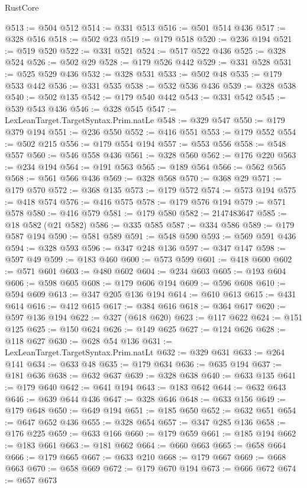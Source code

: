 \begin{lexlean}{RustCore}
\begin{coremodule}
@513 := @504 @512
@514 := @331 @513
@516 := @501 @514 @436
@517 := @328 @516
@518 := @502 @23
@519 := @179 @518
@520 := @236 @194
@521 := @519 @520
@522 := @331 @521
@524 := @517 @522 @436
@525 := @328 @524
@526 := @502 @29
@528 := @179 @526 @442
@529 := @331 @528
@531 := @525 @529 @436
@532 := @328 @531
@533 := @502 @48
@535 := @179 @533 @442
@536 := @331 @535
@538 := @532 @536 @436
@539 := @328 @538
@540 := @502 @135
@542 := @179 @540 @442
@543 := @331 @542
@545 := @539 @543 @436
@546 := @328 @545
@547 := LexLeanTarget.TargetSyntax.Prim.natLe
@548 := @329 @547
@550 := @179 @379 @194
@551 := @236 @550
@552 := @416 @551
@553 := @179 @552
@554 := @502 @215
@556 := @179 @554 @194
@557 := @553 @556
@558 := @548 @557
@560 := @546 @558 @436
@561 := @328 @560
@562 := @176 @220
@563 := @234 @194
@564 := @191 @563
@565 := @189 @564
@566 := @562 @565
@568 := @561 @566 @436
@569 := @328 @568
@570 := @368 @29
@571 := @179 @570
@572 := @368 @135
@573 := @179 @572
@574 := @573 @194
@575 := @418 @574
@576 := @416 @575
@578 := @179 @576 @194
@579 := @571 @578
@580 := @416 @579
@581 := @179 @580
@582 := 2147483647
@585 := @18 @582 (@21 @582)
@586 := @335 @585
@587 := @334 @586
@589 := @179 @587 @194
@590 := @581 @589
@591 := @548 @590
@593 := @569 @591 @436
@594 := @328 @593
@596 := @347 @248 @136
@597 := @347 @147
@598 := @597 @49
@599 := @183 @460
@600 := @573 @599
@601 := @418 @600
@602 := @571 @601
@603 := @480 @602
@604 := @234 @603
@605 := @193 @604
@606 := @598 @605
@608 := @179 @606 @194
@609 := @596 @608
@610 := @594 @609
@613 := @347 @205 @136 @194
@614 := @610 @613
@615 := @431 @614
@616 := @412 @615
@617 := @384 @616
@618 := @364 @617
@620 := @597 @136 @194
@622 := @327 (@618 @620)
@623 := @117 @622
@624 := @151 @125
@625 := @150 @624
@626 := @149 @625
@627 := @124 @626
@628 := @118 @627
@630 := @628 @54 @136
@631 := LexLeanTarget.TargetSyntax.Prim.natLt
@632 := @329 @631
@633 := @264 @141
@634 := @633 @48
@635 := @179 @634
@636 := @635 @194
@637 := @181 @636
@638 := @632 @637
@639 := @328 @638
@640 := @633 @135
@641 := @179 @640
@642 := @641 @194
@643 := @183 @642
@644 := @632 @643
@646 := @639 @644 @436
@647 := @328 @646
@648 := @633 @156
@649 := @179 @648
@650 := @649 @194
@651 := @185 @650
@652 := @632 @651
@654 := @647 @652 @436
@655 := @328 @654
@657 := @347 @285 @136
@658 := @176 @225
@659 := @633 @166
@660 := @179 @659
@661 := @185 @194
@662 := @183 @661
@663 := @181 @662
@664 := @660 @663
@665 := @658 @664
@666 := @179 @665
@667 := @633 @210
@668 := @179 @667
@669 := @668 @663
@670 := @658 @669
@672 := @179 @670 @194
@673 := @666 @672
@674 := @657 @673

\end{coremodule}
\end{lexlean}
